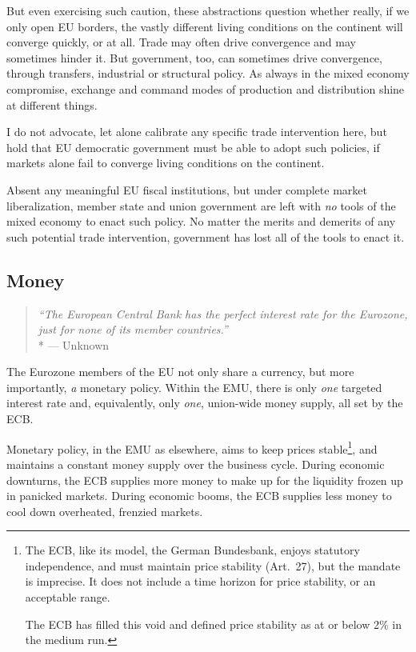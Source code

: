 But even exercising such caution, these abstractions question whether really, if we only open \gls{EU} borders, the vastly different living conditions on the continent will converge quickly, or at all.
Trade may often drive convergence and may sometimes hinder it.
But government, too, can sometimes drive convergence, through transfers, industrial or structural policy.
As always in the mixed economy compromise, exchange and command modes of production and distribution shine at different things.

I do not advocate, let alone calibrate any specific trade intervention here, but hold that \gls{EU} democratic government must be able to adopt such policies, if markets alone fail to converge living conditions on the continent.

Absent any meaningful \gls{EU} fiscal institutions, but under complete market liberalization, member state and union government are left with \emph{no} tools of the mixed economy to enact such policy.
No matter the merits and demerits of any such potential trade intervention, government has lost all of the tools to enact it.

\subsection{Money}

\begin{quote}
	\emph{``The European Central Bank has the perfect interest rate for the Eurozone, just for none of its member countries.''}
	\\*
	--- Unknown
\end{quote}

The Eurozone members of the \gls{EU} not only share a currency, but more importantly, \emph{a} monetary policy.
Within the \gls{EMU}, there is only \emph{one} targeted interest rate and, equivalently, only \emph{one}, union-wide money supply, all set by the \gls{ECB}.

Monetary policy, in the \gls{EMU} as elsewhere, aims to keep prices stable\footnote{
	The \gls{ECB}, like its model, the German Bundesbank, enjoys statutory independence, and must maintain price stability (Art.~27), but the mandate is imprecise.
It does not include a time horizon for price stability, or an acceptable range.

	The \gls{ECB} has filled this void and defined price stability as at or below 2\% in the medium run.},
and maintains a constant money supply over the business cycle.
During economic downturns, the \gls{ECB} supplies more money to make up for the liquidity frozen up in panicked markets.
During economic booms, the \gls{ECB} supplies less money to cool down overheated, frenzied markets.

